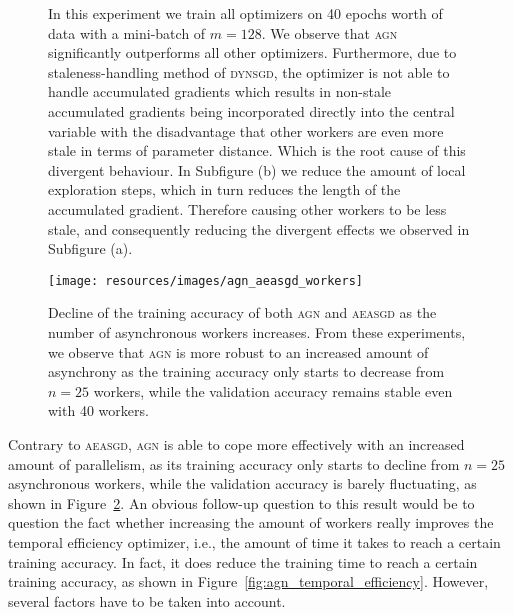 \documentclass[wcp]{jmlr}
\begin{document}
\begin{figure}
  \centering
  \caption{In this experiment we train all optimizers on 40 epochs worth of data with a mini-batch of $m = 128$. We observe that \textsc{agn} significantly outperforms all other optimizers. Furthermore, due to staleness-handling method of \textsc{dynsgd}, the optimizer is not able to handle accumulated gradients which results in non-stale accumulated gradients being incorporated directly into the central variable with the disadvantage that other workers are even more stale in terms of parameter distance. Which is the root cause of this divergent behaviour. In Subfigure (b) we reduce the amount of local exploration steps, which in turn reduces the length of the accumulated gradient. Therefore causing other workers to be less stale, and consequently reducing the divergent effects we observed in Subfigure (a).}
  \label{fig:agn_experiment_1}
\end{figure}

\begin{figure}
  \centering
  \texttt{[image: resources/images/agn\_aeasgd\_workers]}
  \caption{Decline of the training accuracy of both \textsc{agn} and \textsc{aeasgd} as the number of asynchronous workers increases. From these experiments, we observe that \textsc{agn} is more robust to an increased amount of asynchrony as the training accuracy only starts to decrease from $n = 25$ workers, while the validation accuracy remains stable even with 40 workers.}
  \label{fig:agn_aeasgd_workers_performance_decline}
\end{figure}

Contrary to \textsc{aeasgd}, \textsc{agn} is able to cope more effectively with an increased amount of parallelism, as its training accuracy only starts to decline from $n = 25$ asynchronous workers, while the validation accuracy is barely fluctuating, as shown in Figure~\ref{fig:agn_aeasgd_workers_performance_decline}. An obvious follow-up question to this result would be to question the fact whether increasing the amount of workers really improves the temporal efficiency optimizer, i.e., the amount of time it takes to reach a certain training accuracy. In fact, it does reduce the training time to reach a certain training accuracy, as shown in Figure~\ref{fig:agn_temporal_efficiency}. However, several factors have to be taken into account.\\
\end{document}
